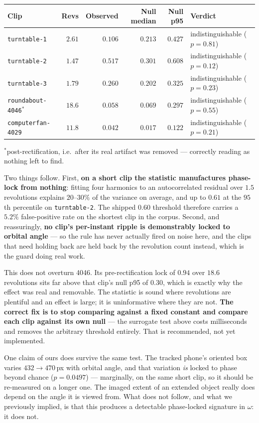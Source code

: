 \documentclass[11pt,a4paper]{article}
\begin{document}
\begin{center}\small
\begin{tabular}{@{}lrrrrl@{}}
\toprule
Clip & Revs & Observed & Null median & Null p95 & Verdict \\
\midrule
\texttt{turntable-1} & $2.61$ & $0.106$ & $0.213$ & $0.427$ & indistinguishable ($p{=}0.81$) \\
\texttt{turntable-2} & $1.47$ & $0.517$ & $0.301$ & $0.608$ & indistinguishable ($p{=}0.12$) \\
\texttt{turntable-3} & $1.79$ & $0.260$ & $0.202$ & $0.325$ & indistinguishable ($p{=}0.23$) \\
\texttt{roundabout-4046}$^*$ & $18.6$ & $0.058$ & $0.069$ & $0.297$ & indistinguishable ($p{=}0.55$) \\
\texttt{computerfan-4029} & $11.8$ & $0.042$ & $0.017$ & $0.122$ & indistinguishable ($p{=}0.21$) \\
\bottomrule
\end{tabular}
\end{center}

\noindent$^*$post-rectification, i.e.\ after its real artifact was removed --- correctly reading
as nothing left to find.

Two things follow. First, \textbf{on a short clip the statistic manufactures phase-lock from
nothing}: fitting four harmonics to an autocorrelated residual over $1.5$ revolutions explains
$20$--$30\%$ of the variance on average, and up to $0.61$ at the $95$th percentile on
\texttt{turntable-2}. The shipped $0.60$ threshold therefore carries a $5.2\%$ false-positive rate
on the shortest clip in the corpus. Second, and reassuringly, \textbf{no clip's per-instant ripple
is demonstrably locked to orbital angle} --- so the rule has never actually fired on noise here,
and the clips that need holding back are held back by the revolution count instead, which is the
guard doing real work.

This does not overturn 4046. Its pre-rectification lock of $0.94$ over $18.6$ revolutions sits far
above that clip's null p95 of $0.30$, which is exactly why the effect was real and removable. The
statistic is sound where revolutions are plentiful and an effect is large; it is uninformative
where they are not. \textbf{The correct fix is to stop comparing against a fixed constant and
compare each clip against its own null} --- the surrogate test above costs milliseconds and
removes the arbitrary threshold entirely. That is recommended, not yet implemented.

One claim of ours does survive the same test. The tracked phone's oriented box varies
$432 \to 470$\,px with orbital angle, and that variation \emph{is} locked to phase beyond chance
($p = 0.0497$) --- marginally, on the same short clip, so it should be re-measured on a longer one.
The imaged extent of an extended object really does depend on the angle it is viewed from. What
does not follow, and what we previously implied, is that this produces a detectable phase-locked
signature in $\omega$: it does not.
\end{document}
